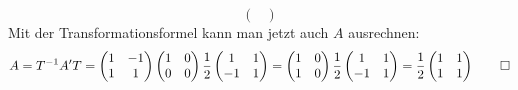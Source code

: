 \begin{loesung}
\begin{teilaufgaben}
\[\begin{pmatrix}
\end{pmatrix}
\]
Mit der Transformationsformel kann man jetzt auch $A$ ausrechnen:
\[
A=T^{-1}A'T
=
\begin{pmatrix}
1&-1\\
1&1
\end{pmatrix}
\begin{pmatrix}
1&0\\
0&0
\end{pmatrix}
\frac12\begin{pmatrix}
1&1\\
-1&1
\end{pmatrix}
=
\begin{pmatrix}1&0\\1&0\end{pmatrix}
\frac12\begin{pmatrix}
1&1\\
-1&1
\end{pmatrix}
=
\frac12
\begin{pmatrix}
1&1\\
1&1
\end{pmatrix}
\qedhere
\]
\end{teilaufgaben}
\end{loesung}

